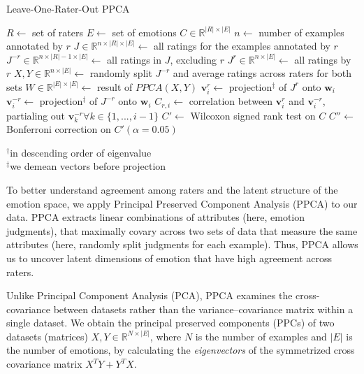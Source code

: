 \documentclass[11pt,a4paper]{article}
\begin{document}
\begin{algorithm}[]
\caption{Leave-One-Rater-Out PPCA}\label{alg:leaveout_ppca}
\begin{algorithmic}[1]
\STATE $R \leftarrow$ set of raters
\STATE $E \leftarrow$ set of emotions
\STATE $C \in \mathbb{R}^{|R| \times |E|}$
\STATE $n \leftarrow$ number of examples annotated by $r$ 
\STATE $J \in \mathbb{R}^{n\times|R|\times|E|} \leftarrow$ all ratings for the examples annotated by $r$
\STATE $J^{-r}\in \mathbb{R}^{n \times |R|-1 \times |E|} \leftarrow$ all ratings in $J$, excluding $r$ 
\STATE $J^{r}  \in \mathbb{R}^{n \times |E|} \leftarrow$ all ratings by $r$
\STATE $X, Y \in \mathbb{R}^{n \times |E|} \leftarrow$  randomly split $J^{-r}$ and average ratings across raters for both sets
\STATE $W \in \mathbb{R}^{|E| \times |E|} \leftarrow$  result of $PPCA(X, Y)$
\STATE $\mathbf{v}^r_i \leftarrow$ projection$^\ddagger$ of $J^r$ onto $\mathbf{w}_i$
\STATE $\mathbf{v}_i^{-r} \leftarrow$ projection$^\ddagger$ of $J^{-r}$  onto $\mathbf{w}_i$
\STATE $C_{r,i} \leftarrow$ correlation between $\mathbf{v}^r_i$ and $\mathbf{v}_i^{-r}$, partialing out $\mathbf{v}^{-r}_k \forall k \in \{1,...,i-1\}$
\ENDFOR
\ENDFOR
\STATE $C' \leftarrow$ Wilcoxon signed rank test on $C$
\STATE $C'' \leftarrow$ Bonferroni correction on $C' (\alpha=0.05)$
\end{algorithmic}
$^\dagger$in descending order of eigenvalue\\
$^\ddagger$we demean vectors before projection
\end{algorithm} 


\noindent To better understand agreement among raters and the latent structure of the emotion space, we apply Principal Preserved Component Analysis (PPCA) \citep{cowen2019primacy} to our data. PPCA extracts linear combinations of attributes (here, emotion judgments), that maximally covary across two sets of data that measure the same attributes (here, randomly split judgments for each example). Thus, PPCA allows us to uncover latent dimensions of emotion that have high agreement across raters.

Unlike Principal Component Analysis (PCA), PPCA examines the cross-covariance
between datasets rather than the variance–covariance matrix
within a single dataset. We obtain the principal preserved components (PPCs) of two datasets (matrices) $X, Y \in \mathbb{R}^{N \times |E|}$, where $N$ is the number of examples and $|E|$ is the number of emotions, by calculating the \emph{eigenvectors} of the symmetrized cross covariance matrix $X^TY + Y^TX$.
\end{document}
